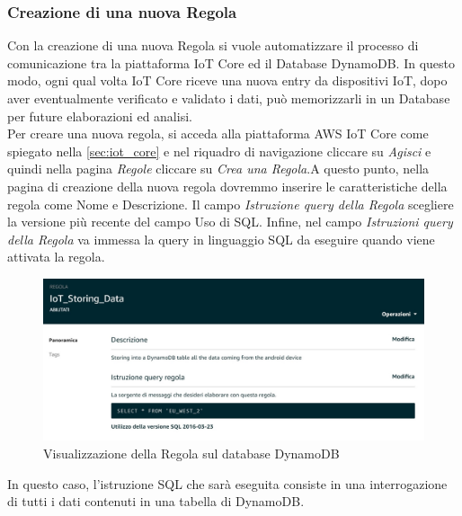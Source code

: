 \subsubsection{Creazione di una nuova Regola}
Con la creazione di una nuova Regola si vuole automatizzare il processo di comunicazione tra la piattaforma IoT Core ed il Database DynamoDB. In questo modo, ogni qual volta IoT Core riceve una nuova entry da dispositivi IoT, dopo aver eventualmente verificato e validato i dati, può memorizzarli in un Database per future elaborazioni ed analisi. \\
Per creare una nuova regola, si acceda alla piattaforma AWS IoT Core come spiegato nella \autoref{sec:iot_core} e nel riquadro di navigazione cliccare su \textit{Agisci} e quindi nella pagina \textit{Regole} cliccare su \textit{Crea una Regola}.A questo punto, nella pagina di creazione della nuova regola dovremmo inserire le caratteristiche della regola come Nome e Descrizione. Il campo \textit{Istruzione query della Regola} scegliere la versione più recente del campo Uso di SQL. Infine, nel campo \textit{Istruzioni query della Regola} va immessa la query in linguaggio SQL da eseguire quando viene attivata la regola.\\
\begin{figure}
	\begin{center}
		\includegraphics[width=0.7\columnwidth]{images/dynamodb_3}
	\end{center}
	\caption{Visualizzazione della Regola sul database DynamoDB}
	\label{fig:dynamodb_3}
\end{figure}
In questo caso, l'istruzione SQL che sarà eseguita consiste in una interrogazione di tutti i dati contenuti in una tabella di DynamoDB.

